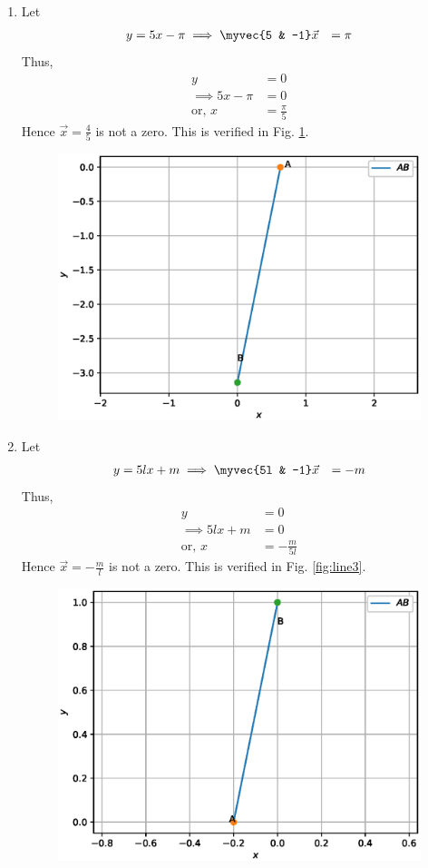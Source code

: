 \begin{enumerate}[label=\arabic*.,ref=\thesubsubsection.\theenumi]
\item Let 
%
\begin{align}
y &= 5x -\pi
\implies \myvec{5 & -1}\vec{x} &= \pi
\end{align}
%
Thus, 
%
\begin{align}
y &= 0 
\\
\implies  5x - \pi &=0
\\
\text{or, } x &= \frac{\pi}{5}
\end{align}
%
Hence $\vec{x}=\frac{4}{5}$ is not a zero. This is verified in Fig. \ref{fig:line2}.
%
\begin{figure}[!ht]
\includegraphics[width=\columnwidth]{./figs/line/line2.eps}
\caption{}
\label{fig:line2}
\end{figure}
\item Let 
%
\begin{align}
y &= 5lx + m
\implies \myvec{5l & -1}\vec{x} &= -m
\end{align}
%
Thus, 
%
\begin{align}
y &= 0 
\\
\implies  5lx + m &=0
\\
\text{or, } x &= -\frac{m}{5l}
\end{align}
%
Hence $\vec{x}=-\frac{m}{l}$ is not a zero. This is verified in Fig. \ref{fig:line3}.
%
\begin{figure}[!ht]
\includegraphics[width=\columnwidth]{./figs/line/line3.eps}

\end{figure}
\end{enumerate}
